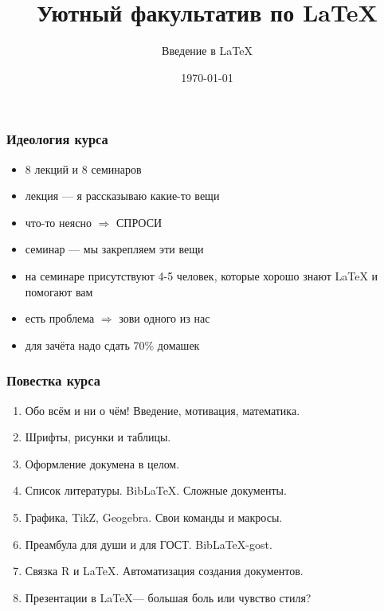 \documentclass[newPxFont]{beamer}
\title{Уютный факультатив по \LaTeX}
\subtitle{Введение в \LaTeX}
\date{\today}
\begin{document}
\begingroup
{}
\begin{frame}[plain]
\begin{center}
\LARGE{\color{red}{ВНИМАНИЕ!}}
\end{center}
\color{white}{ДАННЫЙ КУРС СОДЕРЖИТ БОЛЬШОЕ КОЛИЧЕСТВО РАЗНООБРАЗНОГО КОДА И ЗАДАНИЙ ДЛЯ САМОСТОЯТЕЛЬНОГО РЕШЕНИЯ.\\ НА ПЕРВЫЙ ВЗГЛЯД ОН МОЖЕТ ПОКАЗАТЬСЯ СЛОЖНЫМ И ТРАВМИРОВАТЬ НЕПОДГОТОВЛЕННУЮ ПСИХИКУ. \\ ТАКЖЕ ОН СОДЕРЖИТ БОЛЬШОЕ КОЛИЧЕСТВО НЕУДАЧНЫХ ШУТОК И НЕУМЕСТНЫХ ОТСЫЛОК. \\ В СВЯЗИ С ЭТИМ КУРС НЕ РЕКОМЕНДУЕТСЯ ПРОСЛУШИВАТЬ \ldots НИКОМУ.}
\end{frame}
\endgroup 

 \maketitle
 
\begin{frame}
\frametitle{Идеология курса}
\begin{itemize}
\item 8 лекций и 8 семинаров 
\item лекция --- я рассказываю какие-то вещи
\item что-то неясно $\Rightarrow$ \alert{СПРОСИ}
\item семинар --- мы закрепляем эти вещи
\item на семинаре присутствуют 4-5 человек, которые хорошо знают \LaTeX{} и помогают вам
\item есть проблема $\Rightarrow$ \alert{зови одного из нас}
\item для зачёта надо сдать 70\% домашек
\end{itemize} 
\end{frame} 


\begin{frame}
\frametitle{Повестка курса}
\begin{enumerate}
\item Обо всём и ни о чём! Введение, мотивация, математика.
\item Шрифты, рисунки и таблицы.
\item Оформление докумена в целом.
\item Список литературы. Bib\LaTeX{}. Сложные документы.
\item Графика, TikZ, Geogebra. Свои команды и макросы.
\item Преамбула для души и для ГОСТ. Bib\LaTeX{-gost}.
\item Связка R и \LaTeX{}. Автоматизация создания документов.
\item Презентации в \LaTeX{}--- большая боль или чувство стиля?
\end{enumerate}
\end{frame} 
\end{document}
